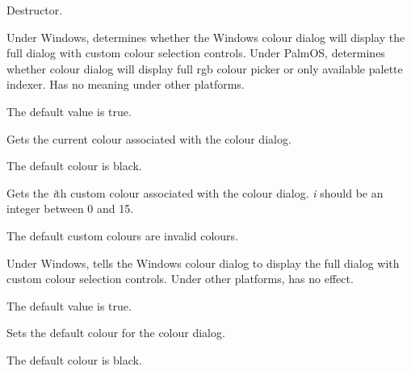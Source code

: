 
Destructor.


\label{wxcolourdatagetchoosefull}


Under Windows, determines whether the Windows colour dialog will display the full dialog
with custom colour selection controls. Under PalmOS, determines whether colour dialog
will display full rgb colour picker or only available palette indexer.
Has no meaning under other platforms.

The default value is true.


\label{wxcolourdatagetcolour}


Gets the current colour associated with the colour dialog.

The default colour is black.


\label{wxcolourdatagetcustomcolour}


Gets the {\it i}th custom colour associated with the colour dialog. {\it i} should
be an integer between 0 and 15.

The default custom colours are invalid colours.


\label{wxcolourdatasetchoosefull}


Under Windows, tells the Windows colour dialog to display the full dialog
with custom colour selection controls. Under other platforms, has no effect.

The default value is true.


\label{wxcolourdatasetcolour}


Sets the default colour for the colour dialog.

The default colour is black.


\label{wxcolourdatasetcustomcolour}


